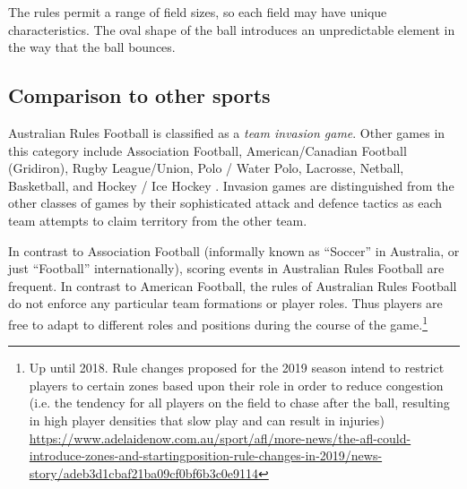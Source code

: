 The rules permit a range of field sizes, so each field may have unique characteristics. The oval shape of the ball introduces an unpredictable element in the way that the ball bounces.

\subsection{Comparison to other sports}

Australian Rules Football is classified as a \emph{team invasion game}.
Other games in this category include Association Football, %
American/Canadian Football (Gridiron), Rugby League/Union, Polo / Water
Polo, Lacrosse, Netball, Basketball, and Hockey / Ice Hockey
\cite{Werner1996}. Invasion games are distinguished from the
other classes of games by their sophisticated attack and defence tactics
as each team attempts to claim territory from the other team.

In contrast to Association Football (informally known as ``Soccer'' in Australia,
or just ``Football'' internationally), scoring events in Australian
Rules Football are frequent. In contrast to American Football, the rules
of Australian Rules Football do not enforce any particular team
formations or player roles. Thus players are free to adapt to different
roles and positions during the course of the game.\footnote{Up until 2018.
Rule changes proposed for the 2019 season intend to restrict players to certain zones
based upon their role in order to reduce congestion (i.e. the tendency for all
players on the field to chase after the ball, resulting in high player densities that
slow play and can result in injuries)
\url{https://www.adelaidenow.com.au/sport/afl/more-news/the-afl-could-introduce-zones-and-startingposition-rule-changes-in-2019/news-story/adeb3d1cbaf21ba09cf0bf6b3c0e9114}}
